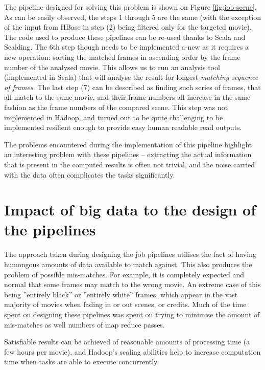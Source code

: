 The pipeline designed for solving this problem is shown on Figure \ref{fig:job-scene}. As can be easily observed, the steps 1 through 5 are the same (with the exception of the input from HBase in step (2) being filtered only for the targeted movie). The code used to produce these pipelines can be re-used thanks to Scala and Scalding. The 6th step though needs to be implemented a-new as it requires a new operation: sorting the matched frames in ascending order by the frame number of the analysed movie. This allows us to run an analysis tool (implemented in Scala) that will analyse the result for longest \textit{matching sequence of frames}. The last step (7) can be described as finding such series of frames, that all match to the same movie, and their frame numbers all increase in the same fashion as the frame numbers of the compared scene. This step was not implemented in Hadoop, and turned out to be quite challenging to be implemented resilient enough to provide easy human readable read outputs. 


The problems encountered during the implementation of this pipeline highlight an interesting problem with these pipelines -- extracting the actual information that is present in the computed results is often not trivial, and the noise carried with the data often complicates the tasks significantly.






\section{Impact of big data to the design of the pipelines}
\label{sec:summing-up-analysis}

The approach taken during designing the job pipelines utilises the fact of having humongous amounts of data available to match against. This also produces the problem of possible mis-matches. For example, it is completely expected and normal that some frames may match to the wrong movie. An extreme case of this being ''entirely black'' or ''entirely white'' frames, which appear in the vast majority of movies when fading in or out scenes, or credits. Much of the time spent on designing these pipelines was spent on trying to minimise the amount of mis-matches as well numbers of map reduce passes.

Satisfiable results can be achieved of reasonable amounts of processing time (a few hours per movie), and Hadoop's scaling abilities help to increase computation time when tasks are able to execute concurrently. 

